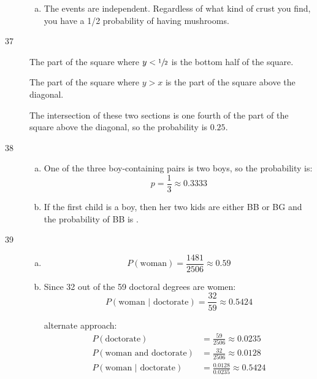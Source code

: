 \documentclass[letterpaper, landscape]{exam}
\begin{document}
\begin{description}
\begin{enumerate}[(a)]
          \item The events are independent. Regardless of what kind of crust you
            find, you have a 1/2 probability of having mushrooms.
        \end{enumerate}

      \item[37]
        The part of the square where $y < \sfrac{1}{2}$ is the bottom half of the
        square.

        The part of the square where $y > x$ is the part of the square above the
        diagonal.

        The intersection of these two sections is one fourth of the part of the
        square above the diagonal, so the probability is $\boxed{ 0.25 }$.

      \item[38]
        \begin{enumerate}[(a)]
          \item One of the three boy-containing pairs is two boys, so the
            probability is:
            \[
              p = \frac{1}{3} \approx \boxed{ 0.3333 }
            \]

          \item If the first child is a boy, then her two kids are either BB or
            BG and the probability of BB is .
        \end{enumerate}

      \item[39]
        \begin{enumerate}[(a)]
          \item 
            \[
              P(\text{woman}) = \frac{1481}{2506} \approx \boxed{ 0.59 }
            \]

          \item
            Since 32 out of the 59 doctoral degrees are women:
            \[
              P( \text{woman } | \text { doctorate} ) = \frac{32}{59} 
                \approx \boxed{ 0.5424 }
            \]

            alternate approach:
            \begin{align*}
              P( \text{doctorate} )                   & = \frac{59}{2506} \approx 0.0235 \\
              P( \text{woman and doctorate} )         & = \frac{32}{2506} \approx 0.0128 \\
              P( \text{woman } | \text { doctorate} ) & = \frac{0.0128}{0.0235}
                \approx 0.5424 \\
            \end{align*}


\end{enumerate}
\end{description}
\end{document}
